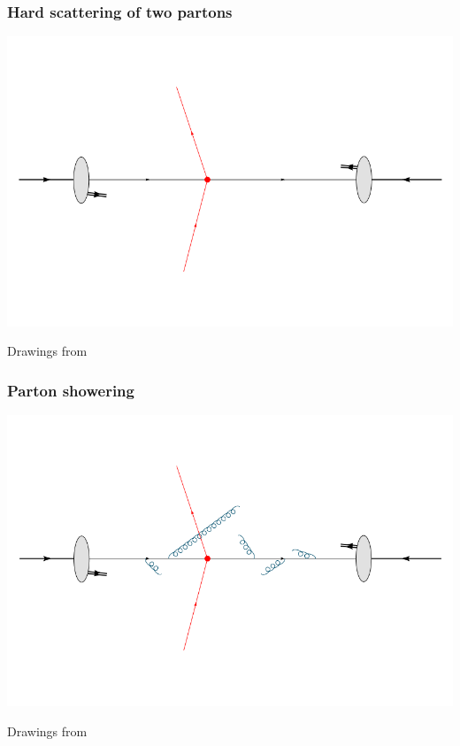 \documentclass[xcolor=dvipsnames,10pt]{beamer}
\begin{document}
\begin{frame}\frametitle{Hard scattering of two partons}
\centering\myskip
\includegraphics[height=0.8\textheight]{../montecarlo/figures/event2}

\begin{flushright}\tiny Drawings from~\cite{Gieseke}\end{flushright}

\end{frame}

\begin{frame}\frametitle{Parton showering}
\centering\myskip
\includegraphics[height=0.8\textheight]{../montecarlo/figures/event3}

\begin{flushright}\tiny Drawings from~\cite{Gieseke}\end{flushright}

\end{frame}
\end{document}
